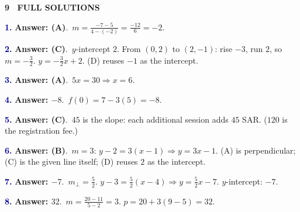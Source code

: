 \documentclass[10pt]{article}
\newcommand{\banner}[1]{\vspace{6pt}\par\noindent\begin{tcolorbox}[enhanced,colback=NAVY,colframe=NAVY,boxrule=0pt,arc=2pt,left=6pt,top=1pt,bottom=1pt,nobeforeafter]\color{white}\bfseries\small\MakeUppercase{#1}\end{tcolorbox}\par\nopagebreak\vspace{2pt}}
\begin{document}
\newpage\banner{9 \textperiodcentered\ Full Solutions}
\begin{minipage}{\linewidth}\textbf{\textcolor{NAVY}{1.}} \textbf{Answer: (A)}.\ $m=\frac{-7-5}{4-(-2)}=\frac{-12}6=-2$.\end{minipage}\par\vspace{5pt}
\begin{minipage}{\linewidth}\textbf{\textcolor{NAVY}{2.}} \textbf{Answer: (C)}.\ $y$-intercept $2$. From $(0,2)$ to $(2,-1)$: rise $-3$, run $2$, so $m=-\frac32$. $y=-\frac32x+2$. (D) reuses $-1$ as the intercept.\end{minipage}\par\vspace{5pt}
\begin{minipage}{\linewidth}\textbf{\textcolor{NAVY}{3.}} \textbf{Answer: (A)}.\ $5x=30\Rightarrow x=6$.\end{minipage}\par\vspace{5pt}
\begin{minipage}{\linewidth}\textbf{\textcolor{NAVY}{4.}} \textbf{Answer: $-8$}.\ $f(0)=7-3(5)=-8$.\end{minipage}\par\vspace{5pt}
\begin{minipage}{\linewidth}\textbf{\textcolor{NAVY}{5.}} \textbf{Answer: (C)}.\ $45$ is the slope: each additional session adds $45$ SAR. ($120$ is the registration fee.)\end{minipage}\par\vspace{5pt}
\begin{minipage}{\linewidth}\textbf{\textcolor{NAVY}{6.}} \textbf{Answer: (B)}.\ $m=3$: $y-2=3(x-1)\Rightarrow y=3x-1$. (A) is perpendicular; (C) is the given line itself; (D) reuses $2$ as the intercept.\end{minipage}\par\vspace{5pt}
\begin{minipage}{\linewidth}\textbf{\textcolor{NAVY}{7.}} \textbf{Answer: $-7$}.\ $m_\perp=\frac52$. $y-3=\frac52(x-4)\Rightarrow y=\frac52x-7$. $y$-intercept: $-7$.\end{minipage}\par\vspace{5pt}
\begin{minipage}{\linewidth}\textbf{\textcolor{NAVY}{8.}} \textbf{Answer: $32$}.\ $m=\frac{20-11}{5-2}=3$. $p=20+3(9-5)=32$.\end{minipage}\par\vspace{5pt}
\end{document}
